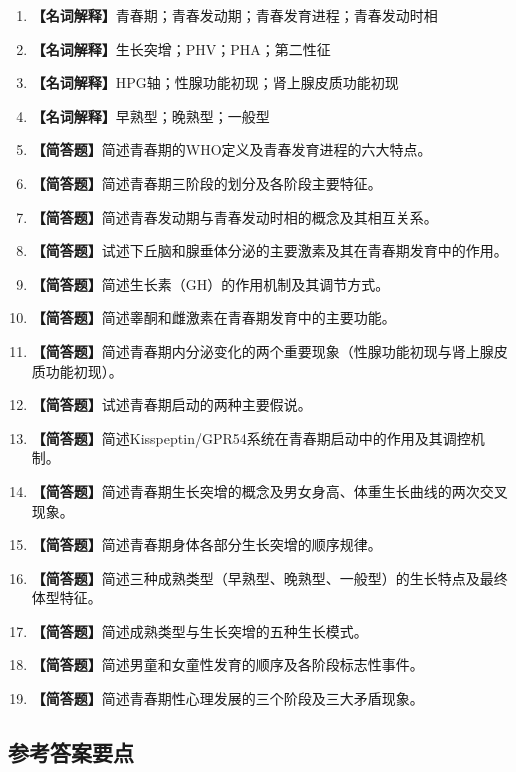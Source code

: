 \begin{enumerate}[leftmargin=*, itemsep=8pt]
    \item \textbf{【名词解释】}青春期；青春发动期；青春发育进程；青春发动时相
    \item \textbf{【名词解释】}生长突增；PHV；PHA；第二性征
    \item \textbf{【名词解释】}HPG轴；性腺功能初现；肾上腺皮质功能初现
    \item \textbf{【名词解释】}早熟型；晚熟型；一般型
    \item \textbf{【简答题】}简述青春期的WHO定义及青春发育进程的六大特点。
    \item \textbf{【简答题】}简述青春期三阶段的划分及各阶段主要特征。
    \item \textbf{【简答题】}简述青春发动期与青春发动时相的概念及其相互关系。
    \item \textbf{【简答题】}试述下丘脑和腺垂体分泌的主要激素及其在青春期发育中的作用。
    \item \textbf{【简答题】}简述生长素（GH）的作用机制及其调节方式。
    \item \textbf{【简答题】}简述睾酮和雌激素在青春期发育中的主要功能。
    \item \textbf{【简答题】}简述青春期内分泌变化的两个重要现象（性腺功能初现与肾上腺皮质功能初现）。
    \item \textbf{【简答题】}试述青春期启动的两种主要假说。
    \item \textbf{【简答题】}简述Kisspeptin/GPR54系统在青春期启动中的作用及其调控机制。
    \item \textbf{【简答题】}简述青春期生长突增的概念及男女身高、体重生长曲线的两次交叉现象。
    \item \textbf{【简答题】}简述青春期身体各部分生长突增的顺序规律。
    \item \textbf{【简答题】}简述三种成熟类型（早熟型、晚熟型、一般型）的生长特点及最终体型特征。
    \item \textbf{【简答题】}简述成熟类型与生长突增的五种生长模式。
    \item \textbf{【简答题】}简述男童和女童性发育的顺序及各阶段标志性事件。
    \item \textbf{【简答题】}简述青春期性心理发展的三个阶段及三大矛盾现象。
\end{enumerate}

\subsection*{参考答案要点}

